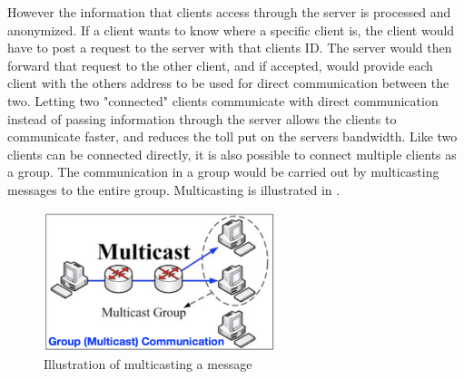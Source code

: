 However the information that clients access through the server is processed and anonymized. If a client wants to know where a specific client is, the client would have to post a request to the server with that clients ID. The server would then forward that request to the other client, and if accepted, would provide each client with the others address to be used for direct communication between the two. Letting two "connected" clients communicate with direct communication instead of passing information through the server allows the clients to communicate faster, and reduces the toll put on the servers bandwidth. Like two clients can be connected directly, it is also possible to connect multiple clients as a group. The communication in a group would be carried out by multicasting messages to the entire group. Multicasting is illustrated in .


\begin{figure}[H]
    \centering
    \includegraphics[width=0.6\textwidth]{images/Multicast.png}
    \caption{Illustration of multicasting a message \cite{slides}}
    \label{fig:Multicast}
\end{figure}







